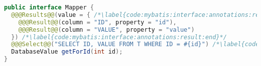 
\begin{lstlisting}[language=Java, caption={MyBatis Mapper interface using annotations}, label={code:mybatis:interface:annotations}]
public interface Mapper {
  @@@Results@@(value = { /*\label{code:mybatis:interface:annotations:result:begin}*/
    @@@Result@@(column = "ID", property = "id"),
    @@@Result@@(column = "VALUE", property = "value")
  }) /*\label{code:mybatis:interface:annotations:result:end}*/
  @@@Select@@("SELECT ID, VALUE FROM T WHERE ID = #{id}") /*\label{code:mybatis:interface:annotations:query}*/
  DatabaseValue getForId(int id);
}
\end{lstlisting}
